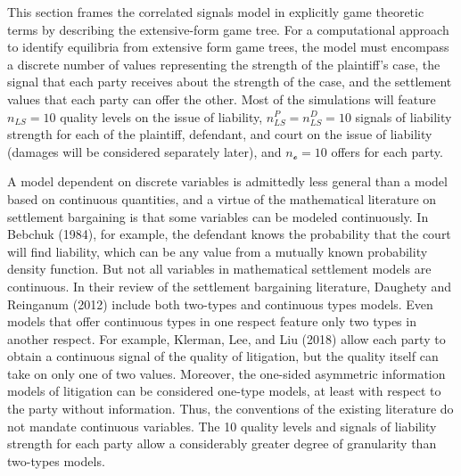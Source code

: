 \documentclass{article}
\begin{document}
This section frames the correlated signals model in explicitly game theoretic terms by describing the extensive-form game tree. For a computational approach to identify equilibria from extensive form game trees, the model must encompass a discrete number of values representing the strength of the plaintiff's case, the signal that each party receives about the strength of the case, and the settlement values that each party can offer the other. Most of the simulations will feature $n_{LS}=10$ quality levels on the issue of liability, $n_{LS}^P=n_{LS}^D=10$ signals of liability strength for each of the plaintiff, defendant, and court on the issue of liability (damages will be considered separately later), and  $n_{\mathcal{o}}=10$ offers for each party. 

A model dependent on discrete variables is admittedly less general than a model based on continuous quantities, and a virtue of the mathematical literature on settlement bargaining is that some variables can be modeled continuously. In Bebchuk (1984), for example, the defendant knows the probability that the court will find liability, which can be any value from a mutually known probability density function. But not all variables in mathematical settlement models are continuous. In their review of the settlement bargaining literature, Daughety and Reinganum (2012) \cite{daughetyreinganum2012} include both two-types and continuous types models. Even models that offer continuous types in one respect feature only two types in another respect. For example, Klerman, Lee, and Liu (2018) \cite{klermanleeliu} allow each party to obtain a continuous signal of the quality of litigation, but the quality itself can take on only one of two values. Moreover, the one-sided asymmetric information models of litigation can be considered one-type models, at least with respect to the party without information.  Thus, the conventions of the existing literature do not mandate continuous variables. The 10 quality levels and signals of liability strength for each party allow a considerably greater degree of granularity than two-types models. 
\end{document}
